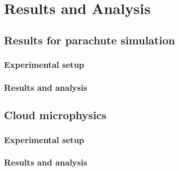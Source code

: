 \chapter{Results and Analysis}
\section{Results for parachute simulation}
\subsection{Experimental setup}

\subsection{Results and analysis}

\section{Cloud microphysics}
\subsection{Experimental setup}

\subsection{Results and analysis}